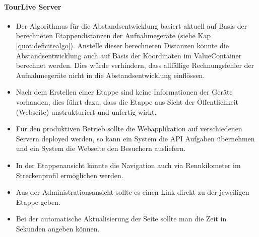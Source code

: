 \paragraph{TourLive Server}
\begin{itemize}
 \item Der Algorithmus für die Abstandsentwicklung basiert aktuell auf Basis der berechneten Etappendistanzen der Aufnahmegeräte (siehe Kap \ref{quot:deficitealgo}). Anstelle dieser berechneten Distanzen könnte die Abstandsentwicklung auch auf Basis der Koordinaten im ValueContainer berechnet werden. Dies würde verhindern, dass allfällige Rechnungsfehler der Aufnahmegeräte nicht in die Abstandsentwicklung einflössen.
 \item Nach dem Erstellen einer Etappe sind keine Informationen der Geräte vorhanden, dies führt dazu, dass die Etappe aus Sicht der Öffentlichkeit (Webseite) unstrukturiert und unfertig wirkt.
 \item Für den produktiven Betrieb sollte die Webapplikation auf verschiedenen Servern deployed werden, so kann ein System die API Aufgaben übernehmen und ein System die Webseite den Besuchern ausliefern.
 \item In der Etappenansicht könnte die Navigation auch via Rennkilometer im Streckenprofil ermöglichen werden.
 \item Aus der Administrationsansicht sollte es einen Link direkt zu der jeweiligen Etappe geben.
 \item Bei der automatische Aktualisierung der Seite sollte man die Zeit in Sekunden angeben können.
\end{itemize}

